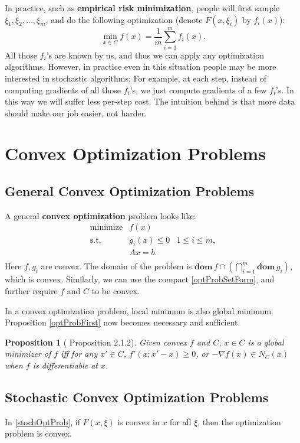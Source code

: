 \documentclass[openany]{book}
\newtheorem{proposition}{Proposition}[chapter]
\theoremstyle{definition}
\theoremstyle{remark}
\begin{document}
In practice, such as \textbf{empirical risk minimization}, people will first sample $\xi_1,\xi_2,\ldots,\xi_m$, and do the following optimization (denote $F(x,\xi_i)$ by $f_i(x)$):
\begin{equation}\label{finiteSum}
    \min_{x\in C}f(x)=\frac{1}{m}\sum_{i=1}^{m}f_i(x).
\end{equation}
All those $f_i$'s are known by us, and thus we can apply any optimization algorithms. However, in practice even in this situation people may be more interested in stochastic algorithms; For example, at each step, instead of computing gradients of all those $f_i$'s, we just compute gradients of a few $f_i$'s. In this way we will suffer less per-step cost. The intuition behind is that more data should make our job easier, not harder.

\section{Convex Optimization Problems}
\subsection{General Convex Optimization Problems}
A general \textbf{convex optimization} problem looks like:
\begin{equation}\label{convOptProb}
\begin{array}{lll}
\mathrm{minimize} & f(x) & \\
\mathrm{s.t.} & g_i(x)\le0 & 1\le i\le m, \\
 & Ax=b. & \\
\end{array}
\end{equation}
Here $f,g_i$ are convex. The domain of the problem is $\mathbf{dom}\,f\cap\left(\bigcap_{i=1}^m\mathbf{dom}\,g_i\right)$, which is convex. Similarly, we can use the compact \eqref{optProbSetForm}, and further require $f$ and $C$ to be convex.

In a convex optimization problem, local minimum is also global minimum. Proposition \ref{optProbFirst} now becomes necessary and sufficient.
\begin{proposition}[\cite{BL10} Proposition 2.1.2]\label{convOptProbFirst}
    Given convex $f$ and $C$, $x\in C$ is a global minimizer of $f$ iff for any $x'\in C$, $f'(x;x'-x)\ge0$, or $-\nabla f(x)\in N_C(x)$ when $f$ is differentiable at $x$.
\end{proposition}

\subsection{Stochastic Convex Optimization Problems}
In \eqref{stochOptProb}, if $F(x,\xi)$ is convex in $x$ for all $\xi$, then the optimization problem is convex.
\end{document}
